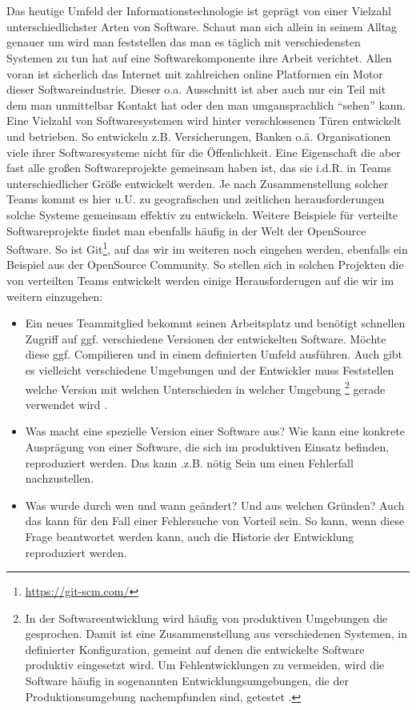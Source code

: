 \chapter{\preamble}
\label{cha:preamble}
Das heutige Umfeld der Informationstechnologie ist gepr\"agt von einer Vielzahl
unterschiedlichster Arten von Software. Schaut man sich allein in seinem Alltag
genauer um wird man feststellen das man es täglich mit verschiedensten Systemen
zu tun hat auf eine Softwarekomponente ihre Arbeit verichtet. Allen voran ist
sicherlich das Internet mit zahlreichen online Platformen ein Motor dieser
Softwareindustrie. Dieser o.a. Ausschnitt ist aber auch nur ein Teil mit dem
man unmittelbar Kontakt hat oder den man umgansprachlich "`sehen"' kann.  Eine
Vielzahl von Softwaresystemen wird hinter verschlossenen T\"uren entwickelt und
betrieben. So entwickeln z.B.  Versicherungen, Banken o.\"a.  Organisationen
viele ihrer Softwaresysteme nicht f\"ur die \"Offenlichkeit. Eine Eigenschaft
die aber fast alle gro\ss{}en Softwareprojekte gemeinsam haben ist, das sie
i.d.R. in Teams unterschiedlicher Gr\"o\ss{}e entwickelt werden. Je nach
Zusammenstellung solcher Teams kommt es hier u.U. zu geografischen und
zeitlichen herausforderungen solche Systeme gemeinsam effektiv zu entwickeln.
Weitere Beispiele f\"ur verteilte Softwareprojekte findet man ebenfalls
h\"aufig in der Welt der \gls{OpenSource} Software. So ist
Git\footnote{\label{git:1}\url{https://git-scm.com/}}, auf das wir im weiteren noch
eingehen werden, ebenfalls ein Beispiel aus der \gls{OpenSource} Community. So
stellen sich in solchen Projekten die von verteilten Teams entwickelt werden
einige Herausforderugen auf die wir im weitern einzugehen:
\begin{itemize}
  \item Ein neues Teammitglied bekommt seinen Arbeitsplatz und ben\"otigt
  schnellen Zugriff auf ggf. verschiedene Versionen der entwickelten Software.
  M\"ochte diese ggf. Compilieren und in einem definierten Umfeld ausf\"uhren.
  Auch gibt es vielleicht verschiedene Umgebungen und der Entwickler muss
  Feststellen welche Version mit welchen Unterschieden in welcher \gls{Umgebung}
  \footnote{\label{umgebung:1}In der Softwareentwicklung wird häufig von
  produktiven Umgebungen die gesprochen.  Damit ist eine Zusammenstellung aus
  verschiedenen Systemen, in definierter Konfiguration, gemeint auf denen die
  entwickelte Software produktiv eingesetzt wird. Um Fehlentwicklungen zu
  vermeiden, wird die Software häufig in sogenannten Entwicklungsumgebungen,
  die der Produktionsumgebung nachempfunden sind, getestet \cite[s.~49,
  250]{cd}.} gerade verwendet wird \citep[s.~26]{cd}.
  \item Was macht eine spezielle Version einer Software aus?  Wie kann eine
  konkrete Auspr\"agung von einer Software, die sich im produktiven Einsatz
  befinden, reproduziert werden. Das kann .z.B. n\"otig Sein um einen
  Fehlerfall nachzustellen\cite[s.~33]{cd}.
  \item Was wurde durch wen und wann ge\"andert? Und aus welchen Gr\"unden?
  Auch das kann f\"ur den Fall einer Fehlersuche von Vorteil sein. So kann,
  wenn diese Frage beantwortet werden kann, auch die Historie der Entwicklung
  reproduziert werden\cite[s.~33]{cd}.
\end{itemize}
